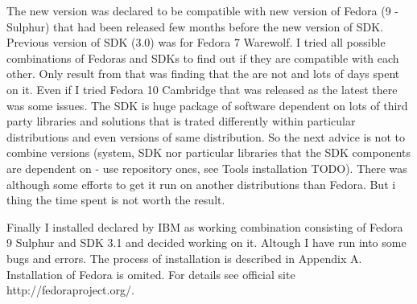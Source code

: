 The new version was declared to be compatible with new version of Fedora (9 - Sulphur) that had been released few months before the new version of SDK. Previous version of SDK (3.0) was for Fedora 7 Warewolf. I tried all possible combinations of Fedoras and SDKs to find out if they are compatible with each other. Only result from that was finding that the are not and lots of days spent on it. Even if I tried Fedora 10 Cambridge that was released as the latest there was some issues. The SDK is huge package of software dependent on lots of third party libraries and solutions that is trated differently within particular distributions and even versions of same distribution. So the next advice is not to combine versions (system, SDK nor particular libraries that the SDK components are dependent on - use repository ones, see Tools installation TODO). There was although some efforts to get it run on another distributions than Fedora. But i thing the time spent is not worth the result.

Finally I installed declared by IBM as working combination consisting of Fedora 9 Sulphur and SDK 3.1 and decided working on it. Altough I have run into some bugs and errors. The process of installation is described in Appendix A. Installation of Fedora is omited. For details see official site http://fedoraproject.org/.
